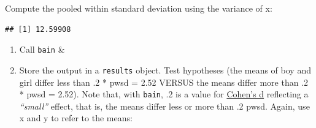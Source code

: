 \documentclass[
]{book}
\newenvironment{Shaded}{\begin{snugshade}}{\end{snugshade}}
\newcommand{\AttributeTok}[1]{\textcolor[rgb]{0.77,0.63,0.00}{#1}}
\newcommand{\CommentTok}[1]{\textcolor[rgb]{0.56,0.35,0.01}{\textit{#1}}}
\newcommand{\ConstantTok}[1]{\textcolor[rgb]{0.00,0.00,0.00}{#1}}
\newcommand{\DecValTok}[1]{\textcolor[rgb]{0.00,0.00,0.81}{#1}}
\newcommand{\FunctionTok}[1]{\textcolor[rgb]{0.00,0.00,0.00}{#1}}
\newcommand{\NormalTok}[1]{#1}
\newcommand{\OtherTok}[1]{\textcolor[rgb]{0.56,0.35,0.01}{#1}}
\newcommand{\SpecialCharTok}[1]{\textcolor[rgb]{0.00,0.00,0.00}{#1}}
\begin{document}
\begin{Shaded}
\end{Shaded}

Compute the pooled within standard deviation using the variance of x:

\begin{Shaded}
\end{Shaded}

\begin{verbatim}
## [1] 12.59908
\end{verbatim}

\begin{enumerate}
\def\labelenumi{\arabic{enumi})}
\setcounter{enumi}{1}
\item
  Call \texttt{bain} \&
\item
  Store the output in a \texttt{results} object.
  Test hypotheses (the means of boy and girl differ less than .2 * pwsd =
  2.52 VERSUS the means differ more than .2 * pwsd = 2.52).
  Note that, with \texttt{bain}, .2 is a value for \href{https://en.wikiversity.org/wiki/Cohen\%27s_d\#:~:text=Cohen's\%20d\%20is\%20an\%20effect,the\%20comparison\%20between\%20two\%20means.}{Cohen's d} reflecting a \emph{``small''} effect, that
  is, the means differ less or more than .2 pwsd. Again, use x and y to refer to the means:
\end{enumerate}
\end{document}
